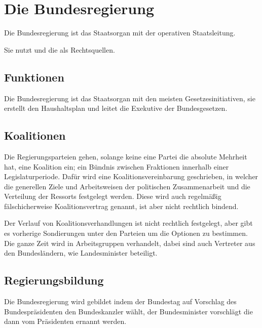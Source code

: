 \documentclass{article}
\begin{document}
\section{Die Bundesregierung} 
Die Bundesregierung ist das Staatsorgan mit der operativen Staatsleitung.

Sie nutzt  \GG und die  als Rechtsquellen.

\subsection{Funktionen}
Die Bundesregierung ist das Staatsorgan mit den meisten Gesetzesinitiativen, sie erstellt den Haushaltsplan und leitet die Exekutive der Bundesgesetzen.

\subsection{Koalitionen}
Die Regierungsparteien gehen, solange keine eine Partei die absolute Mehrheit hat, eine Koalition ein; ein Bündnis zwischen Fraktionen innerhalb einer Legislaturperiode. Dafür wird eine Koalitionsvereinbarung geschrieben, in welcher die generellen Ziele und Arbeitsweisen der politischen Zusammenarbeit und die Verteilung der Ressorts festgelegt werden. Diese wird auch regelmäßig fälschicherweise Koalitionsvertrag genannt, ist aber nicht rechtlich bindend.

Der Verlauf von Koalitionsverhandlungen ist nicht rechtlich festgelegt, aber \idr gibt es vorherige Sondierungen unter den Parteien um die Optionen zu bestimmen. Die ganze Zeit wird in Arbeitsgruppen verhandelt, dabei sind auch Vertreter aus den Bundesländern, wie Landesminister beteiligt.

\subsection{Regierungsbildung}
Die Bundesregierung wird gebildet indem der Bundestag auf Vorschlag des Bundespräsidenten den Bundeskanzler wählt, der Bundesminister vorschlägt die dann vom Präsidenten ernannt werden.
\end{document}
